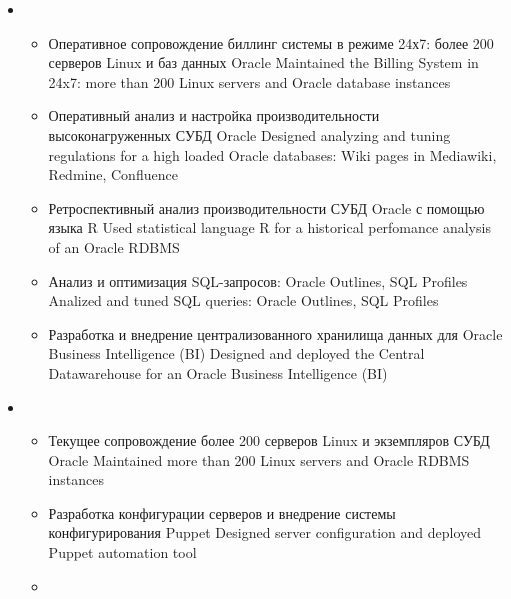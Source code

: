 \documentclass[11pt,a4paper,sans, russian]{moderncv}        %
\begin{document}
{\begin{itemize}
\begin{itemize}
			\item {}
				{Разработка регламентов обеспечения отказоустойчивости систем биллинга: Oracle STANDBY database, Oracle DataGuard, Oracle GoldenGate}
				{Designed a fault tolerance strategy for the Billing System: Oracle standby, Oracle DataGuard, Oracle GoldenGate}
		\end{itemize}
	\item {}
		\begin{itemize}
			\item {}
				{Оперативное сопровождение биллинг системы в режиме 24х7: более 200 серверов Linux и баз данных Oracle}
				{Maintained the Billing System in 24x7: more than 200 Linux servers and Oracle database instances}
			\item {}
				{Оперативный анализ и настройка производительности высоконагруженных СУБД Oracle}
				{Designed analyzing and tuning regulations for a high loaded Oracle databases: Wiki pages in Mediawiki, Redmine, Confluence}
			\item {}
				{Ретроспективный анализ производительности СУБД Oracle с помощью языка R}
				{Used statistical language R for a historical perfomance analysis of an Oracle RDBMS}
			\item {}
				{Анализ и оптимизация SQL-запросов: Oracle Outlines, SQL Profiles}
				{Analized and tuned SQL queries: Oracle Outlines, SQL Profiles}
			\item {}
				{Разработка и внедрение централизованного хранилища данных для Oracle Business Intelligence (BI)}
				{Designed and deployed the Central Datawarehouse for an Oracle Business Intelligence (BI)}
		\end{itemize}
	\item {}
		\begin{itemize}
			\item {}
				{Текущее сопровождение более 200 серверов Linux и экземпляров СУБД Oracle}
				{Maintained more than 200 Linux servers and Oracle RDBMS instances}
			\item {}
				{Разработка конфигурации серверов и внедрение системы конфигурирования Puppet}
				{Designed server configuration and deployed Puppet automation tool}
			\item {}

\end{itemize}
\end{itemize}}
\end{document}
